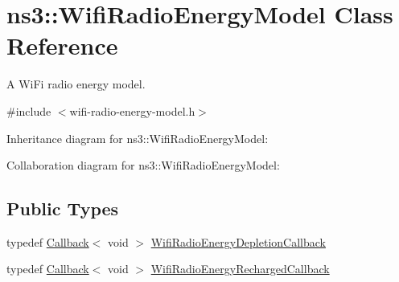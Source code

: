 \hypertarget{classns3_1_1WifiRadioEnergyModel}{}\section{ns3\+:\+:Wifi\+Radio\+Energy\+Model Class Reference}
\label{classns3_1_1WifiRadioEnergyModel}


A Wi\+Fi radio energy model.  




{\ttfamily \#include $<$wifi-\/radio-\/energy-\/model.\+h$>$}



Inheritance diagram for ns3\+:\+:Wifi\+Radio\+Energy\+Model\+:


Collaboration diagram for ns3\+:\+:Wifi\+Radio\+Energy\+Model\+:
\subsection*{Public Types}
\begin{DoxyCompactItemize}
\item 
typedef \hyperlink{classns3_1_1Callback}{Callback}$<$ void $>$ \hyperlink{classns3_1_1WifiRadioEnergyModel_afdab2f5c9b565fd1ef7cf3fddd62ffab}{Wifi\+Radio\+Energy\+Depletion\+Callback}
\item 
typedef \hyperlink{classns3_1_1Callback}{Callback}$<$ void $>$ \hyperlink{classns3_1_1WifiRadioEnergyModel_a1b594cba69350dd9bb93fc525f6124c4}{Wifi\+Radio\+Energy\+Recharged\+Callback}
\end{DoxyCompactItemize}
